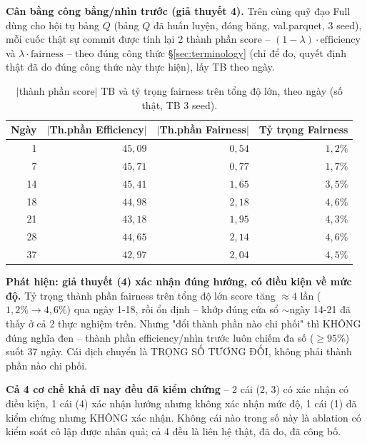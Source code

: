 \documentclass[10pt,twocolumn,a4paper]{article}
\begin{document}
\textbf{Cân bằng công bằng/nhìn trước (giả thuyết 4).} Trên cùng quỹ đạo
Full dùng cho hội tụ bảng $Q$ (bảng $Q$ đã huấn luyện, đóng băng,
val.parquet, 3 seed), mỗi cuốc thật sự commit được tính lại 2 thành phần
score -- $(1-\lambda)\cdot\text{efficiency}$ và
$\lambda\cdot\text{fairness}$ -- theo đúng công thức \S\ref{sec:terminology}
(chỉ để đo, quyết định thật đã do đúng công thức này thực hiện), lấy TB
theo ngày.

\begin{table}[h!]
\centering
\caption{$|$thành phần score$|$ TB và tỷ trọng fairness trên tổng độ lớn, theo ngày (số thật, TB 3 seed).}
\label{tab:fairbalance}
\footnotesize
\begin{tabular}{@{}rrrr@{}}
\toprule
Ngày & $|$Th.phần Efficiency$|$ & $|$Th.phần Fairness$|$ & Tỷ trọng Fairness \\
\midrule
1  & $45,09$ & $0,54$ & $1,2\%$ \\
7  & $45,71$ & $0,77$ & $1,7\%$ \\
14 & $45,41$ & $1,65$ & $3,5\%$ \\
18 & $44,98$ & $2,18$ & $4,6\%$ \\
21 & $43,18$ & $1,95$ & $4,3\%$ \\
28 & $44,65$ & $2,14$ & $4,6\%$ \\
37 & $42,97$ & $2,04$ & $4,5\%$ \\
\bottomrule
\end{tabular}
\end{table}

\textbf{Phát hiện: giả thuyết (4) xác nhận đúng hướng, có điều kiện về
mức độ.} Tỷ trọng thành phần fairness trên tổng độ lớn score tăng
$\approx4$ lần ($1,2\%\to4,6\%$) qua ngày 1-18, rồi ổn định -- khớp đúng
cửa sổ $\sim$ngày 14-21 đã thấy ở cả 2 thực nghiệm trên. Nhưng "đổi thành
phần nào chi phối" thì KHÔNG đúng nghĩa đen -- thành phần
efficiency/nhìn trước luôn chiếm đa số ($\geq95\%$) suốt 37 ngày. Cái
dịch chuyển là TRỌNG SỐ TƯƠNG ĐỐI, không phải thành phần nào chi phối.

\textbf{Cả 4 cơ chế khả dĩ nay đều đã kiểm chứng} -- 2 cái (2, 3) có xác
nhận có điều kiện, 1 cái (4) xác nhận hướng nhưng không xác nhận mức độ,
1 cái (1) đã kiểm chứng nhưng KHÔNG xác nhận. Không cái nào trong số này
là ablation có kiểm soát cô lập được nhân quả; cả 4 đều là liên hệ thật,
đã đo, đã công bố.
\end{document}
